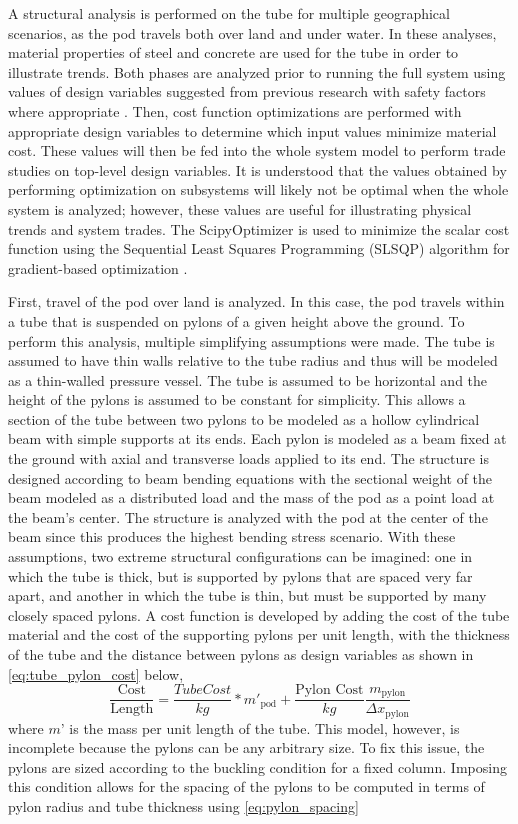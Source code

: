 A structural analysis is performed on the tube for multiple geographical scenarios,
as the pod travels both over land and under water.
In these analyses, material properties of steel and concrete are used for the
tube in order to illustrate trends.
Both phases are analyzed prior to running the full system using values of
design variables suggested from previous research with safety factors where
appropriate \cite{Chin}. Then, cost function optimizations are performed with
appropriate design variables to determine which input values minimize material cost.
These values will then be fed into the whole system model to perform trade
studies on top-level design variables. It is understood that the values
obtained by performing optimization on subsystems will likely not be optimal
when the whole system is analyzed; however, these values are useful for
illustrating physical trends and system trades. The ScipyOptimizer is used to
minimize the scalar cost function using the Sequential Least Squares Programming
(SLSQP) algorithm for gradient-based optimization \cite{GrayBenchmarking2013,Scipy}.

First, travel of the pod over land is analyzed. In this case, the pod travels
within a tube that is suspended on pylons of a given height above the ground.
To perform this analysis, multiple simplifying assumptions were made. The
tube is assumed to have thin walls relative to the tube radius and thus will be
modeled as a thin-walled pressure vessel. The tube is assumed to be horizontal
and the height of the pylons is assumed to be constant for simplicity. This allows a section
of the tube between two pylons to be modeled as a hollow cylindrical beam with
simple supports at its ends. Each pylon is modeled as a beam fixed at the
ground with axial and transverse loads applied to its end. The structure is
designed according to beam bending equations with the sectional weight of the
beam modeled as a distributed load and the mass of the pod as a point load at
the beam’s center. The structure is analyzed with the pod at the center of the
beam since this produces the highest bending stress scenario.  With these
assumptions, two extreme structural configurations can be imagined: one in
which the tube is thick, but is supported by pylons that are spaced very far apart,
and another in which the tube is thin, but must be supported by many closely spaced pylons.
A cost function is developed by adding the cost of the tube material and the
cost of the supporting pylons per unit length, with the thickness of the tube
and the distance between pylons as design variables as shown in \cref{eq:tube_pylon_cost} below,
\begin{equation}
	\label{eq:tube_pylon_cost}
	\frac{\text{Cost}}{\text{Length}} = \frac{Tube Cost}{kg}*m'_\text{pod} + \frac{\text{Pylon Cost}}{kg}\frac{m_\text{pylon}}{\Delta x_\text{pylon}}
\end{equation}
where $m’$ is the mass per unit length of the tube. This model, however, is
incomplete because the pylons can be any arbitrary size. To fix this issue,
the pylons are sized according to the buckling condition for a fixed column.
Imposing this condition allows for the spacing of the pylons to be computed in
terms of pylon radius and tube thickness using \cref{eq:pylon_spacing}


